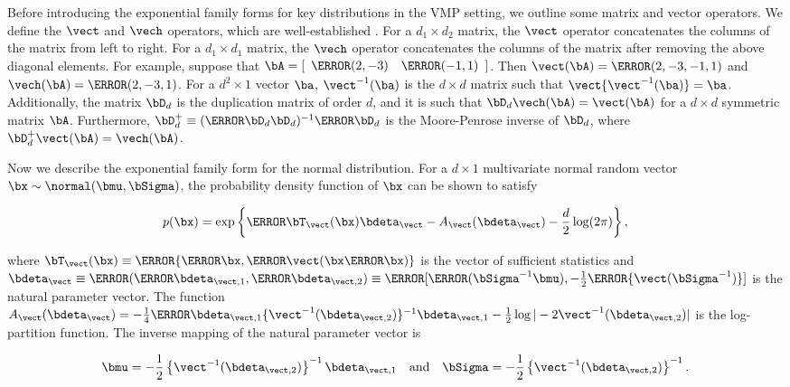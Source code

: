 \documentclass[ba]{imsart}
\numberwithin{equation}{section}
\theoremstyle{plain}
\begin{document}
Before introducing the exponential family forms for key distributions in the VMP setting, we outline some
matrix and vector operators. We define the $\vect$ and $\vech$ operators,
which are well-established \citep[e.g.][]{gentle07}.
For a $d_1 \times d_2$ matrix, the $\vect$ operator concatenates the columns of the matrix from left to right.
For a $d_1 \times d_1$ matrix, the $\vech$ operator concatenates the columns of the matrix after removing
the above diagonal elements. For example, suppose that $\bA = [\begin{array}{c c} \T{(2, -3)} & \T{(-1, 1)} \end{array}]$.
Then $\vect (\bA) = \T{(2, -3, -1, 1)}$ and $\vech (\bA) = \T{(2, -3, 1)}$.
For a $d^2 \times 1$ vector
$\ba$, $\vect^{-1} (\ba)$ is the $d \times d$ matrix such that $\vect \{\vect^{-1} (\ba)\} = \ba$. Additionally, the matrix
$\bD_d$ is the duplication matrix of order $d$, and it is such that $\bD_d \vech (\bA) = \vect (\bA)$ for a
$d \times d$ symmetric matrix $\bA$. Furthermore, $\bD_d^{+} \equiv (\T{\bD_d} \bD_d)^{-1} \T{\bD_d}$ is the
Moore-Penrose inverse of $\bD_d$, where $\bD_d^+ \vect (\bA) = \vech(\bA)$.

Now we describe the exponential family form for the normal distribution.
For a $d \times 1$ multivariate normal
random vector $\bx \sim \normal (\bmu, \bSigma)$, the probability density function of $\bx$ can be shown to satisfy

\begin{equation}
	p(\bx) = \exp \left\{ \T{\bT_{\vect} (\bx)} \bdeta_{\vect} - A_{\vect} (\bdeta_{\vect}) - \frac{d}{2} \log (2 \pi) \right\},
\label{vec_repn}
\end{equation}

\noindent where $\bT_{\vect} (\bx) \equiv \T{\{ \T{\bx}, \T{\vect ( \bx \T{\bx} )} \}}$ is the vector of sufficient statistics
and $\bdeta_{\vect} \equiv \T{( \T{\bdeta_{\vect, 1}}, \T{\bdeta_{\vect, 2}} )} \equiv \T{[ \T{( \bSigma^{-1} \bmu )},
-\frac12 \T{\{ \vect (\bSigma^{-1}) \}} ]}$ is the natural parameter vector.
The function $A_{\vect} (\bdeta_{\vect}) =
-\frac14 \T{\bdeta}_{\vect, 1} \{ \vect^{-1} (\bdeta_{\vect, 2}) \}^{-1} \bdeta_{\vect, 1}
- \frac12 \log | -2 \vect^{-1} (\bdeta_{\vect, 2}) |$ is the log-partition function.
The inverse mapping of the natural parameter vector is \cite[equation~S.4]{wand17}

\begin{equation}
	\bmu = -\frac12 \left\{ \vect^{-1} (\bdeta_{\vect, 2}) \right\}^{-1} \bdeta_{\vect, 1} \quad
	\text{and} \quad
	\bSigma = -\frac12 \left\{ \vect^{-1} (\bdeta_{\vect, 2}) \right\}^{-1}.
\label{gauss_vec_comm_params}
\end{equation}
\end{document}
